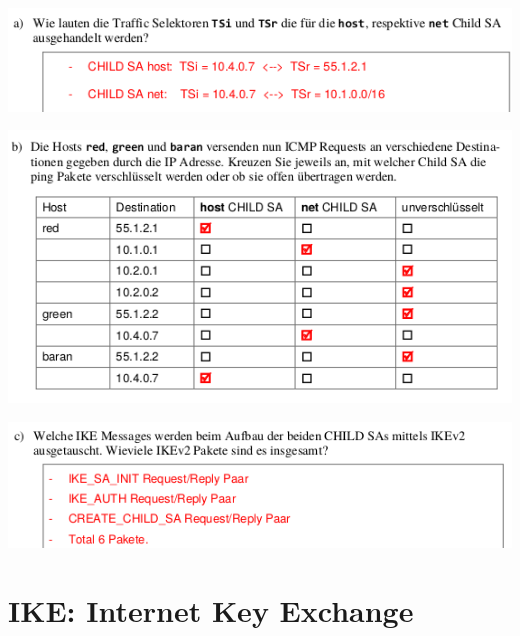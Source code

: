 \begin{minipage}[t]{0.8\textwidth}
        \includegraphics[width=\linewidth]{images/hs18-19-ipsec-exc1.png}
\end{minipage}

\begin{minipage}[t]{0.8\textwidth}
        \includegraphics[width=\linewidth]{images/hs18-19-ipsec-exc2.png}
\end{minipage}


\begin{minipage}[t]{0.8\textwidth}
        \includegraphics[width=\linewidth]{images/hs18-19-ipsec-exc3.png}
\end{minipage}


\section{IKE: Internet Key Exchange}\label{sec:ike}
